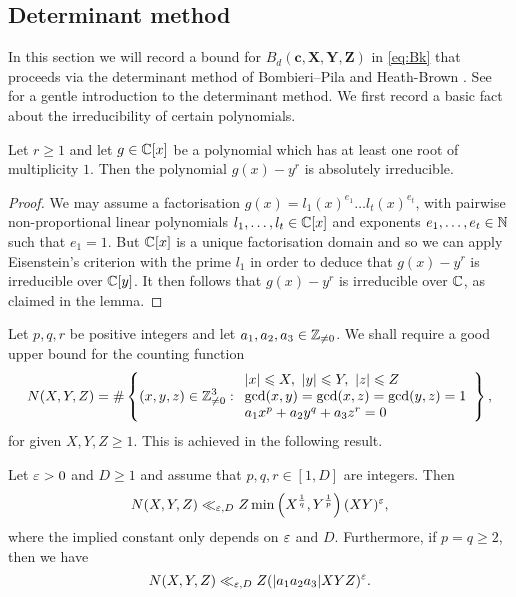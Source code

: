 \subsection{Determinant method}\label{s:det}

In this section we will record a bound for  $B_d(\mathbf{c},\mathbf{X},\mathbf{Y},\mathbf{Z})$  in  \eqref{eq:Bk} that proceeds via the determinant method of Bombieri--Pila \cite{bp} and Heath-Brown \cite{cime}. See \cite{bl} for a gentle introduction to the determinant method.
We first record a  basic fact about the irreducibility of certain polynomials.

\begin{lemma}\label{eis}
Let $r\geq 1$ and let $g\in \mathbb{C}[x]$ be a polynomial
which has  at least one root of multiplicity $1$.
Then the polynomial $g(x)-y^r$ is absolutely irreducible.
\end{lemma}

\begin{proof}
We may assume  a factorisation
 $g(x)=l_1(x)^{e_1}\dots l_t(x)^{e_t}$, with
pairwise non-proportional linear polynomials $l_1,\dots,l_t\in \mathbb{C}[x]$ and exponents $e_1,\dots,e_t\in \mathbb{N}$ such that
$e_1=1$.  But  ${\mathbb{C}}[x]$ is a unique factorisation domain and so we can apply Eisenstein's criterion
with the prime $l_1$ in order
to deduce that
$g(x)-y^r$ is  irreducible over $ {\mathbb{C}}[y]$. It then follows that
$g(x)-y^r$ is  irreducible over $ \mathbb{C}$, as claimed in the lemma.
\end{proof}




Let $p,q,r$ be positive integers and let  $a_1,a_2,a_3\in \mathbb{Z}_{\neq 0}$.
We shall require a good upper bound for the counting function
$$
N(X,Y,Z)=
\#\left\{ (x,y,z)\in \mathbb{Z}_{\neq 0}^3:
\begin{array}{l}
|x|\leqslant X, ~|y|\leqslant Y,~|z|\leqslant Z\\
\gcd(x,y)=\gcd(x,z)=\gcd(y,z)=1	\\
a_1x^p+a_2 y^q+a_3 z^r=0
\end{array}
\right\},
$$
for given $X,Y,Z\geq 1$.   This is achieved in the following  result.

\begin{lemma}\label{lem:t15}
Let $\varepsilon>0$ and $D\geq 1$ and
assume that  $p,q,r\in [1,D]$ are integers. Then
$$
N(X,Y,Z)\ll_{\varepsilon,D} Z \min\left(X^{\frac{1}{q}}, Y^{\frac{1}{p}} \right) (XY)^\varepsilon,
$$
where the implied constant only depends on $\varepsilon$ and $D$. Furthermore,
if $p=q\geq 2$,
then we have
$$
N(X,Y,Z)\ll_{\varepsilon,D} Z (|a_1a_2a_3|XYZ)^\varepsilon.
$$
\end{lemma}


